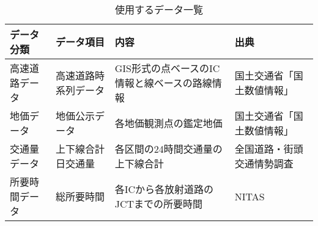 \begin{table}[h!]
  \centering
  \renewcommand{\arraystretch}{1.2} %
  \begin{tabularx}{\textwidth}{p{} p{} p{} X}
  \toprule
  \textbf{データ分類}     &\textbf{データ項目}         & \textbf{内容}                                    & \textbf{出典}                   \\
  \midrule
  高速道路データ          &高速道路時系列データ         & GIS形式の点ベースのIC情報と線ベースの路線情報           & 国土交通省「国土数値情報」    \\
  地価データ             &地価公示データ              & 各地価観測点の鑑定地価                                & 国土交通省「国土数値情報」    \\
  交通量データ            &上下線合計日交通量           & 各区間の24時間交通量の上下線合計                       & 全国道路・街頭交通情勢調査              \\
  所要時間データ          &総所要時間                  & 各ICから各放射道路のJCTまでの所要時間                   & NITAS            \\
  \bottomrule
  \end{tabularx}
  \caption{使用するデータ一覧}
  \label{data_list}
  \end{table}
  

